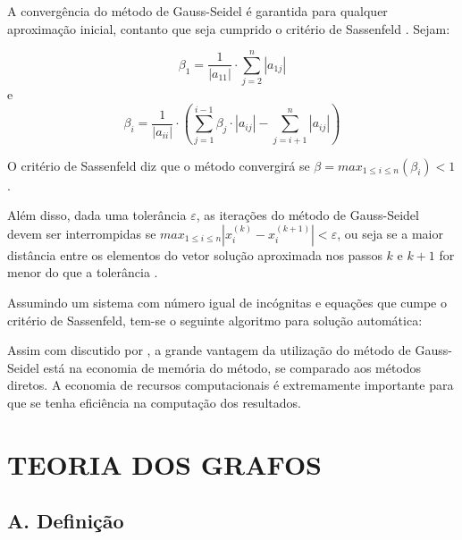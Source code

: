 \documentclass[twocolumn, 10pt,a4paper]{extarticle}
\begin{document}
A convergência do método de Gauss-Seidel é garantida para qualquer aproximação inicial, contanto que seja cumprido o critério de Sassenfeld \cite[p. 171]{ruggiero}. Sejam:

\[
\beta_1 = \frac{1}{|a_{11}|} \cdot \sum_{j=2}^{n} |a_{1j}|
\]
e
\[
\beta_i = \frac{1}{|a_{ii}|} \cdot \left(\sum_{j=1}^{i-1} \beta_j\cdot |a_{ij}| - \sum_{j=i+1}^{n} |a_{ij}|\right)
\]

O critério de Sassenfeld diz que o método convergirá se $\beta = max_{1 \leq i \leq n} (\beta_i) < 1$ \cite[p. 173]{ruggiero}.

Além disso, dada uma tolerância $\varepsilon$, as iterações do método de Gauss-Seidel devem ser interrompidas se $max_{1 \leq i \leq n} |x^{(k)}_i-x^{(k+1)}_i| < \varepsilon$, ou seja se a maior distância entre os elementos do vetor solução aproximada nos passos $k$ e $k+1$ for menor do que a tolerância \cite[p. 155]{ruggiero}.

Assumindo um sistema com número igual de incógnitas e equações que cumpe o critério de Sassenfeld, tem-se o seguinte algoritmo para solução automática:

\begingroup
{}\label{gs}
\begin{algorithmic}[1]
			\EndFor
			\EndFor
		\EndFor
		\EndIf
	\EndFor
\EndFunction
\end{algorithmic}
\hrulefill
\endgroup

Assim com discutido por \cite{chapra}, a grande vantagem da utilização do método de Gauss-Seidel está na economia de memória do método, se comparado aos métodos diretos. A economia de recursos computacionais é extremamente importante para que se tenha eficiência na computação dos resultados. 


\section{TEORIA DOS GRAFOS}
\subsection*{A. \quad Definição}
\end{document}
